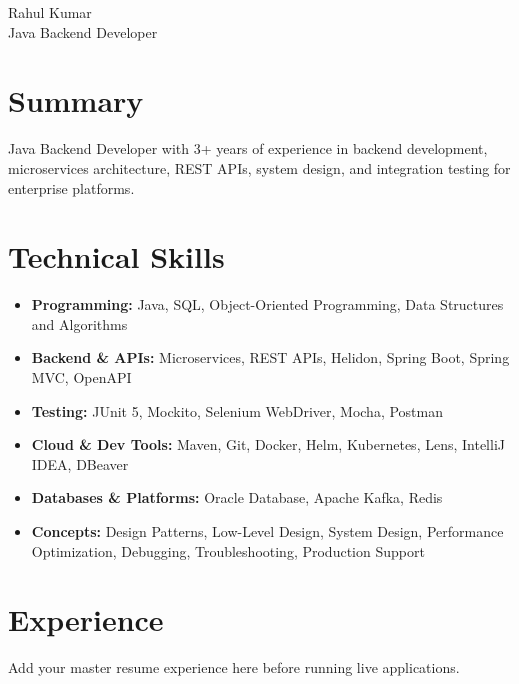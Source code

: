 \documentclass[10pt,a4paper]{article}
\begin{document}
\begin{center}
    {\LARGE Rahul Kumar}\\
    Java Backend Developer
\end{center}

\section*{Summary}
Java Backend Developer with 3+ years of experience in backend development, microservices architecture, REST APIs, system design, and integration testing for enterprise platforms.

\section*{Technical Skills}
\begin{itemize}
    \item \textbf{Programming:} Java, SQL, Object-Oriented Programming, Data Structures and Algorithms
    \item \textbf{Backend \& APIs:} Microservices, REST APIs, Helidon, Spring Boot, Spring MVC, OpenAPI
    \item \textbf{Testing:} JUnit 5, Mockito, Selenium WebDriver, Mocha, Postman
    \item \textbf{Cloud \& Dev Tools:} Maven, Git, Docker, Helm, Kubernetes, Lens, IntelliJ IDEA, DBeaver
    \item \textbf{Databases \& Platforms:} Oracle Database, Apache Kafka, Redis
    \item \textbf{Concepts:} Design Patterns, Low-Level Design, System Design, Performance Optimization, Debugging, Troubleshooting, Production Support
\end{itemize}

\section*{Experience}
Add your master resume experience here before running live applications.
\end{document}
